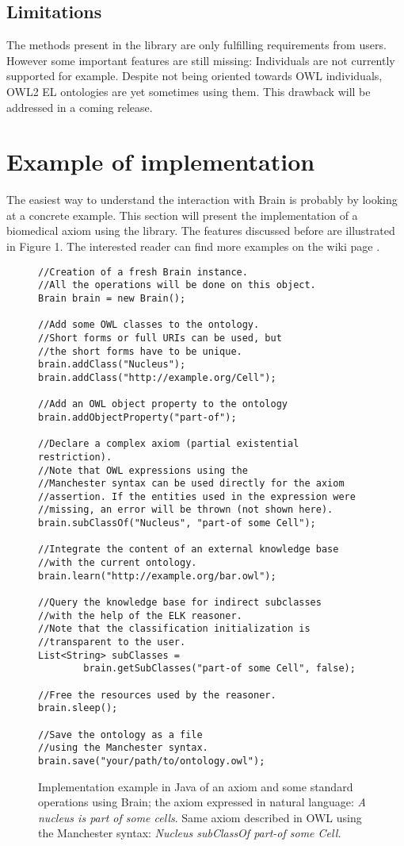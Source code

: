 \documentclass{llncs}
\begin{document}
\subsection{Limitations}
The methods present in the library are only fulfilling requirements from users. However some important 
features are still missing: Individuals are not currently supported for example. Despite not being oriented towards OWL individuals, OWL2 EL
ontologies are yet sometimes using them. This drawback will be addressed in a coming release.

\section{Example of implementation}

The easiest way to understand the interaction with Brain is probably by looking at a concrete example. 
This section will present the implementation
of a biomedical axiom using the library. The features discussed before are illustrated in Figure 1.
The interested reader can find more examples on the wiki page \cite{examples}.

\begin{figure}[h]
\begingroup
\fontsize{10pt}{9pt}\selectfont
\begin{Verbatim}[frame=single]
//Creation of a fresh Brain instance.
//All the operations will be done on this object.
Brain brain = new Brain();

//Add some OWL classes to the ontology.
//Short forms or full URIs can be used, but 
//the short forms have to be unique.
brain.addClass("Nucleus");
brain.addClass("http://example.org/Cell");

//Add an OWL object property to the ontology
brain.addObjectProperty("part-of");

//Declare a complex axiom (partial existential restriction).
//Note that OWL expressions using the 
//Manchester syntax can be used directly for the axiom
//assertion. If the entities used in the expression were
//missing, an error will be thrown (not shown here).
brain.subClassOf("Nucleus", "part-of some Cell");

//Integrate the content of an external knowledge base
//with the current ontology.
brain.learn("http://example.org/bar.owl");

//Query the knowledge base for indirect subclasses
//with the help of the ELK reasoner.
//Note that the classification initialization is
//transparent to the user.
List<String> subClasses = 
		brain.getSubClasses("part-of some Cell", false);

//Free the resources used by the reasoner.
brain.sleep();

//Save the ontology as a file
//using the Manchester syntax.
brain.save("your/path/to/ontology.owl");
\end{Verbatim}
\endgroup
\caption{Implementation example in Java of an axiom and some standard operations using Brain; the axiom expressed in natural language:
 \textit{A nucleus is part of some cells}. Same axiom described in OWL using the Manchester syntax: 
 \textit{Nucleus subClassOf part-of some Cell.}}
\end{figure}
\end{document}
